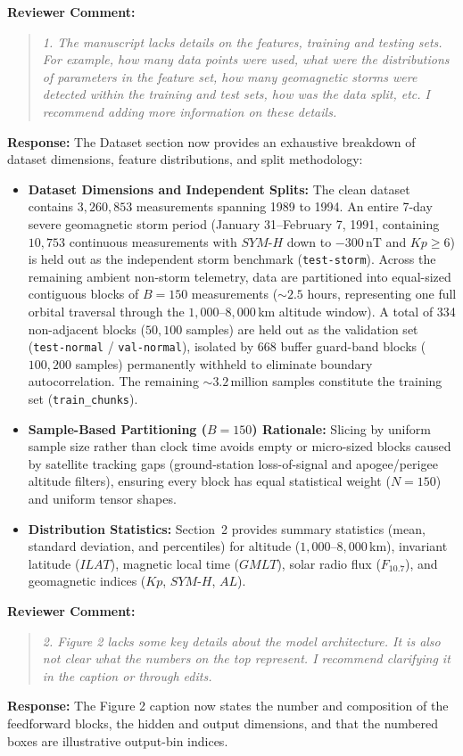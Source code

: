 \documentclass[a4paper,12pt]{article}
\newcommand{\reviewercomment}[1]{%
  \begin{samepage}%
  \par\noindent\textbf{Reviewer Comment:}\par
  \begin{quote}\itshape #1\end{quote}}
\newcommand{\filledresponse}[1]{%
  \par\noindent\textbf{Response:} #1\par
  \vspace{0.4cm}%
  \end{samepage}}
\begin{document}
\reviewercomment{1. The manuscript lacks details on the features, training and testing sets. For example, how many
data points were used, what were the distributions of parameters in the feature set, how many
geomagnetic storms were detected within the training and test sets, how was the data split, etc. I
recommend adding more information on these details.}
\filledresponse{The Dataset section now provides an exhaustive breakdown of dataset dimensions, feature distributions, and split methodology:
\begin{itemize}
    \item \textbf{Dataset Dimensions and Independent Splits:} The clean dataset contains $3{,}260{,}853$ measurements spanning 1989 to 1994. An entire 7-day severe geomagnetic storm period (January 31--February 7, 1991, containing $10{,}753$ continuous measurements with $SYM\text{-}H$ down to $-300$\,nT and $Kp \ge 6$) is held out as the independent storm benchmark (\texttt{test-storm}). Across the remaining ambient non-storm telemetry, data are partitioned into equal-sized contiguous blocks of $B = 150$ measurements ($\sim 2.5$ hours, representing one full orbital traversal through the $1{,}000$--$8{,}000$\,km altitude window). A total of 334 non-adjacent blocks ($50{,}100$ samples) are held out as the validation set (\texttt{test-normal} / \texttt{val-normal}), isolated by 668 buffer guard-band blocks ($100{,}200$ samples) permanently withheld to eliminate boundary autocorrelation. The remaining $\sim 3.2$\,million samples constitute the training set (\texttt{train\_chunks}).
    \item \textbf{Sample-Based Partitioning ($B = 150$) Rationale:} Slicing by uniform sample size rather than clock time avoids empty or micro-sized blocks caused by satellite tracking gaps (ground-station loss-of-signal and apogee/perigee altitude filters), ensuring every block has equal statistical weight ($N = 150$) and uniform tensor shapes.
    \item \textbf{Distribution Statistics:} Section~2 provides summary statistics (mean, standard deviation, and percentiles) for altitude ($1{,}000$--$8{,}000$\,km), invariant latitude ($ILAT$), magnetic local time ($GMLT$), solar radio flux ($F_{10.7}$), and geomagnetic indices ($Kp$, $SYM\text{-}H$, $AL$).
\end{itemize}}

\reviewercomment{2. Figure 2 lacks some key details about the model architecture. It is also not clear what the
numbers on the top represent. I recommend clarifying it in the caption or through edits.}
\filledresponse{The Figure 2 caption now states the number and composition of the feedforward blocks,
the hidden and output dimensions, and that the numbered boxes are illustrative output-bin indices.}
\end{document}
